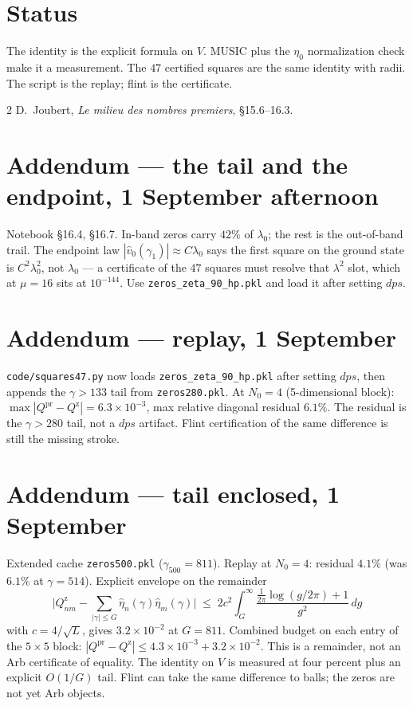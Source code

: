 \documentclass[10pt]{article}
\begin{document}
\section{Status}

The identity is the explicit formula on $V$. MUSIC plus the
$\eta_0$ normalization check make it a measurement. The $47$
certified squares are the same identity with radii. The script is the
replay; flint is the certificate.

\begin{thebibliography}{2}\small
{} D.~Joubert, \emph{Le milieu des nombres premiers},
\S15.6--16.3.
\end{thebibliography}

\section*{Addendum --- the tail and the endpoint, 1 September afternoon}

Notebook \S16.4, \S16.7. In-band zeros carry $42\%$ of $\lambda_0$; the
rest is the out-of-band trail. The endpoint law
$|\hat v_0(\gamma_1)|\approx C\lambda_0$ says the first square on the
ground state is $C^2\lambda_0^2$, not $\lambda_0$ --- a certificate of
the $47$ squares must resolve that $\lambda^2$ slot, which at $\mu=16$
sits at $10^{-144}$. Use \texttt{zeros\_zeta\_90\_hp.pkl} and load it
after setting $dps$.

\section*{Addendum --- replay, 1 September}

\texttt{code/squares47.py} now loads \texttt{zeros\_zeta\_90\_hp.pkl}
after setting $dps$, then appends the $\gamma>133$ tail from
\texttt{zeros280.pkl}. At $N_0=4$ (5-dimensional block):
$\max|Q^{\mathrm{pr}}-Q^{\mathrm{z}}|=6.3\times10^{-3}$,
max relative diagonal residual $6.1\%$. The residual is the
$\gamma>280$ tail, not a $dps$ artifact. Flint certification of the
same difference is still the missing stroke.

\section*{Addendum --- tail enclosed, 1 September}

Extended cache \texttt{zeros500.pkl} ($\gamma_{500}=811$). Replay at
$N_0=4$: residual $4.1\%$ (was $6.1\%$ at $\gamma=514$). Explicit
envelope on the remainder
\[
\bigl|Q^{\mathrm{z}}_{nm}-\sum_{|\gamma|\le G}\hat\eta_n(\gamma)\hat\eta_m(\gamma)\bigr|
\;\le\;
2c^2\int_G^\infty\frac{\tfrac1{2\pi}\log(g/2\pi)+1}{g^2}\,dg
\]
with $c=4/\sqrt L$, gives $3.2\times10^{-2}$ at $G=811$. Combined
budget on each entry of the $5\times5$ block:
$|Q^{\mathrm{pr}}-Q^{\mathrm{z}}|\le 4.3\times10^{-3}+3.2\times10^{-2}$.
This is a remainder, not an Arb certificate of equality. The identity
on $V$ is measured at four percent plus an explicit $O(1/G)$ tail.
Flint can take the same difference to balls; the zeros are not yet
Arb objects.
\end{document}
